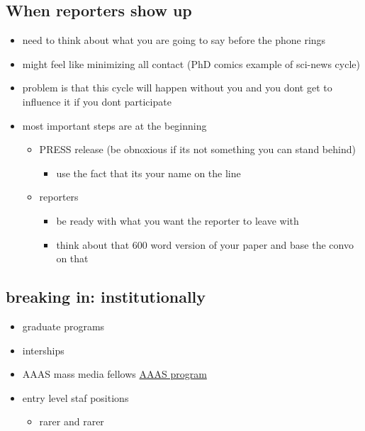 \documentclass[letterpaper]{scrartcl}
\begin{document}
\subsection{When reporters show up}\label{when-reporters-show-up}

\begin{itemize}
\itemsep1pt\parskip0pt
\item
  need to think about what you are going to say before the phone rings
\item
  might feel like minimizing all contact (PhD comics example of sci-news
  cycle)
\item
  problem is that this cycle will happen without you and you dont get to
  influence it if you dont participate
\item
  most important steps are at the beginning

  \begin{itemize}
  \itemsep1pt\parskip0pt
  \item
    PRESS release (be obnoxious if its not something you can stand
    behind)

    \begin{itemize}
    \itemsep1pt\parskip0pt
    \item
      use the fact that its your name on the line
    \end{itemize}
  \item
    reporters

    \begin{itemize}
    \itemsep1pt\parskip0pt
    \item
      be ready with what you want the reporter to leave with
    \item
      think about that 600 word version of your paper and base the convo
      on that
    \end{itemize}
  \end{itemize}
\end{itemize}

\subsection{breaking in:
institutionally}\label{breaking-in-institutionally}

\begin{itemize}
\itemsep1pt\parskip0pt
\item
  graduate programs
\item
  interships
\item
  AAAS mass media fellows
  \href{aaas.org/programs/education/MassMedia}{AAAS program}
\item
  entry level staf positions

  \begin{itemize}
  \itemsep1pt\parskip0pt
  \item
    rarer and rarer
  \end{itemize}
\end{itemize}
\end{document}
